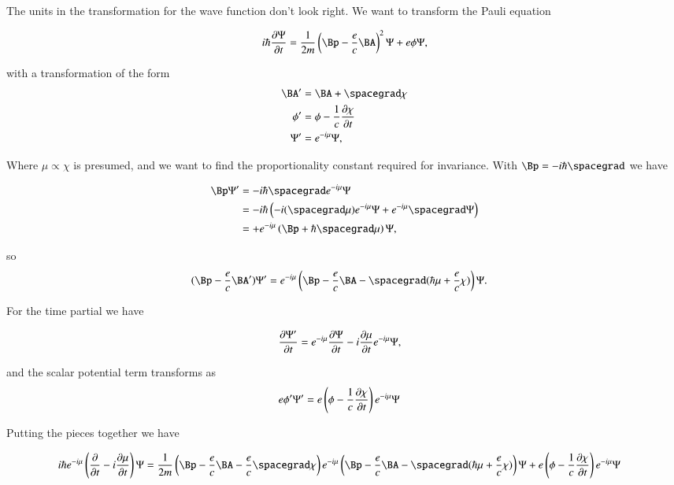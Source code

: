 The units in the transformation for the wave function don't look right.  We want to transform the Pauli equation

\begin{align*}
i \hbar \PD{t}{\Psi} = \inv{2 m} \left( \Bp - \frac{e}{c} \BA \right)^2 \Psi + e \phi \Psi,
\end{align*}

with a transformation of the form
\begin{align*}
\BA' &= \BA + \spacegrad \chi \\
\phi' &= \phi - \inv{c} \PD{t}{\chi} \\
\Psi' &= e^{-i \mu} \Psi,
\end{align*}

Where $\mu \propto \chi$ is presumed, and we want to find the proportionality constant required for invariance.  With $\Bp = - i \hbar \spacegrad$ we have

\begin{align*}
\Bp \Psi' 
&=
-i \hbar \spacegrad e^{-i \mu} \Psi \\
&=
-i \hbar \left( 
-i (\spacegrad \mu) e^{-i \mu} \Psi 
+ e^{-i \mu} \spacegrad \Psi  
\right) \\
&=
+ e^{-i \mu} \left( \Bp + \hbar \spacegrad \mu \right) \Psi,
\end{align*}

so
\begin{align*}
(\Bp -\frac{e}{c} \BA' )\Psi' 
&=
e^{-i \mu} \left( \Bp - \frac{e}{c} \BA - \spacegrad (\hbar \mu + \frac{e}{c} \chi) \right) \Psi.
\end{align*}

For the time partial we have

\begin{align*}
\PD{t}{\Psi'} &= e^{-i \mu} \PD{t}{\Psi} -i \PD{t}{\mu} e^{-i \mu} \Psi,
\end{align*}

and the scalar potential term transforms as
\begin{align*}
e \phi' \Psi'
&=
e \left( \phi - \inv{c} \PD{t}{\chi} \right) e^{-i \mu } \Psi
\end{align*}

Putting the pieces together we have

\begin{align*}
i \hbar e^{-i \mu}
\left( \PD{t}{} -i \PD{t}{\mu} \right) \Psi 
&=
\inv{2m}
\left(\Bp -\frac{e}{c} \BA -\frac{e}{c} \spacegrad \chi \right)
e^{-i \mu} \left( \Bp - \frac{e}{c} \BA - \spacegrad (\hbar \mu + \frac{e}{c} \chi) \right) \Psi 
+ e \left( \phi - \inv{c} \PD{t}{\chi} \right) e^{-i \mu } \Psi
\end{align*}

